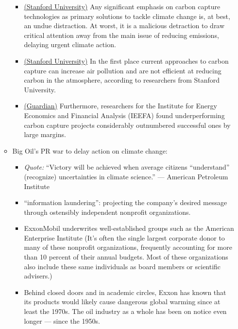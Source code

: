 \documentclass[oneside]{book}
\begin{document}
\begin{enumerate}
\begin{itemize}
\begin{itemize}
                \item \href{https://news.stanford.edu/stories/2019/10/study-casts-doubt-carbon-capture}{(Stanford University)} Any significant emphasis on carbon capture technologies as primary solutions to tackle climate change is, at best, an undue distraction. At worst, it is a malicious detraction to draw critical attention away from the main issue of reducing emissions, delaying urgent climate action. 
                \item \href{https://news.stanford.edu/stories/2019/10/study-casts-doubt-carbon-capture}{(Stanford University)} In the first place current approaches to carbon capture can increase air pollution and are not efficient at reducing carbon in the atmosphere, according to researchers from Stanford University.
                \item \href{https://www.theguardian.com/environment/2022/sep/01/carbon-capture-is-not-a-solution-to-net-zero-emissions-plans-report-says}{(Guardian)} Furthermore, researchers for the Institute for Energy Economics and Financial Analysis (IEEFA) found underperforming carbon capture projects considerably outnumbered successful ones by large margins.
            \end{itemize}
            \item Big Oil's PR war to delay action on climate change:
            \begin{itemize}
                \item \textit{Quote:} ``Victory will be achieved when average citizens “understand”
                (recognize) uncertainties in climate science.'' --- American Petroleum Institute
                \item ``information laundering'':
                projecting the company's desired message through
                ostensibly independent nonprofit organizations. 
                \item ExxonMobil underwrites well-established
                groups such as the American Enterprise Institute \footnotesize(It's often the single largest corporate donor to many of these nonprofit organizations, frequently accounting for more than 10 percent of their annual budgets. Most of these organizations also include
                these same individuals as board members or
                scientific advisers.)\normalsize
                \item Behind closed doors and in academic circles, Exxon has known that its products would likely cause dangerous global warming since at least the 1970s. The oil industry as a whole has been on notice even longer --- since the 1950s.

\end{itemize}
\end{itemize}
\end{enumerate}
\end{document}
